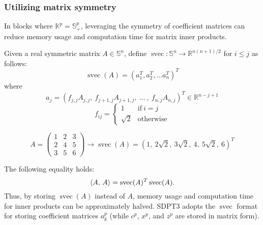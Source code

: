 \subsubsection{Utilizing matrix symmetry}
In blocks where $\mathbb{K}^p=\mathbb{S}_+^p$, leveraging the symmetry of coefficient matrices can reduce memory usage and computation time for matrix inner products.

Given a real symmetric matrix $A\in \mathbb{S}^n$, define $\operatorname{svec}: \mathbb{S}^n \rightarrow \mathbb{R}^{n(n+1)/2}$ for $i\leq j$ as follows:
\[ \operatorname{svec}(A)= (a_1^T, a_2^T, \ldots a_n^T)^T \]
where
\[ a_j = (f_{j,j} A_{j,j}, ~ f_{j+1,j}A_{j+1,j}, ~ \ldots ~ , ~ f_{n,j} A_{n,j})^T \in \mathbb{R}^{n-j+1} \]
\[ f_{ij}= \begin{cases} 1 & \text{if} ~ i=j \\ \sqrt{2} & \text{otherwise} \end{cases}\]

\begin{example}
\[A = \begin{pmatrix}
    1 & 2 & 3\\
    2 & 4 & 5\\
    3 & 5 & 6
\end{pmatrix} \rightarrow \operatorname{svec}(A) = (1, ~ 2\sqrt{2}, ~ 3\sqrt{2}, ~ 4, ~ 5\sqrt{2}, ~ 6)^T\]
\end{example}

The following equality holds:
\[\left\langle A, \, A \right\rangle = \operatorname{svec}(A)^T \operatorname{svec}(A).\]
Thus, by storing $\operatorname{svec}(A)$ instead of $A$, memory usage and computation time for inner products can be approximately halved.
SDPT3 adopts the $\operatorname{svec}$ format for storing coefficient matrices $a^p_k$ (while $c^p$, $x^p$, and $z^p$ are stored in matrix form).


